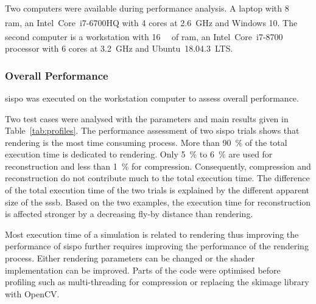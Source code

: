 Two computers were available during performance analysis. A laptop with \SI{8}{\giga\byte} \gls{ram}, an Intel\textsuperscript{\textregistered}~Core\texttrademark~i7-6700HQ with \SI{4}{} cores at \SI{2.6}{\giga\hertz} and Windows 10. The second computer is a workstation with \SI{16}{\giga\byte} of \gls{ram}, an Intel\textsuperscript{\textregistered}~Core\texttrademark~i7-8700 processor with \SI{6}{} cores at \SI{3.2}{\giga\hertz} and Ubuntu~18.04.3~LTS.

\subsubsection{Overall Performance}
\gls{sispo} was executed on the workstation computer to assess overall performance.

Two test cases were analysed with the parameters and main results given in Table~\ref{tab:profiles}. The performance assessment of two \gls{sispo} trials shows that rendering is the most time consuming process. More than \SI{90}{\percent} of the total execution time is dedicated to rendering.  Only \SI{5}{\percent} to \SI{6}{\percent} are used for reconstruction and less than \SI{1}{\percent} for compression. Consequently, compression and reconstruction do not contribute much to the total execution time. The difference of the total execution time of the two trials is explained by the different apparent size of the \gls{sssb}. Based on the two examples, the execution time for reconstruction is affected stronger by a decreasing fly-by distance than rendering.

Most execution time of a simulation is related to rendering thus improving the performance of \gls{sispo} further requires improving the performance of the rendering process. Either rendering parameters can be changed or the shader implementation can be improved. Parts of the code were optimised before profiling such as multi-threading for compression or replacing the \gls{skimage} library with OpenCV.

